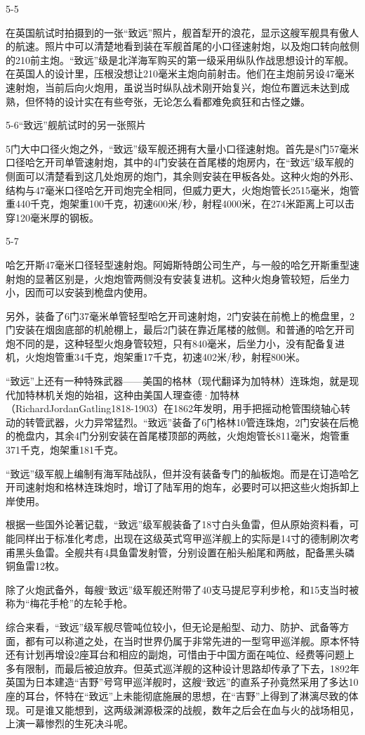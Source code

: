 \documentclass[12pt,UTF8]{ctexbook}
\begin{document}
5-5

在英国航试时拍摄到的一张“致远”照片，舰首犁开的浪花，显示这艘军舰具有傲人的航速。照片中可以清楚地看到装在军舰首尾的小口径速射炮，以及炮口转向舷侧的210前主炮。“致远”级是北洋海军购买的第一级采用纵队作战思想设计的军舰。在英国人的设计里，压根没想让210毫米主炮向前射击。他们在主炮前另设47毫米速射炮，当前后向火炮用，虽说当时纵队战术刚开始复兴，炮位布置远未达到成熟，但怀特的设计实在有些夸张，无论怎么看都难免疯狂和古怪之嫌。

5-6“致远”舰航试时的另一张照片

5门大中口径火炮之外，“致远”级军舰还拥有大量小口径速射炮。首先是8门57毫米口径哈乞开司单管速射炮，其中的4门安装在首尾楼的炮房内，在“致远”级军舰的侧面可以清楚看到这几处炮房的炮门，其余则安装在甲板各处。这种火炮的外形、结构与47毫米口径哈乞开司炮完全相同，但威力更大，火炮炮管长2515毫米，炮管重440千克，炮架重100千克，初速600米/秒，射程4000米，在274米距离上可以击穿120毫米厚的钢板。

5-7

哈乞开斯47毫米口径轻型速射炮。阿姆斯特朗公司生产，与一般的哈乞开斯重型速射炮的显著区别是，火炮炮管两侧没有安装复进机。这种火炮身管较短，后坐力小，因而可以安装到桅盘内使用。

另外，装备了6门37毫米单管轻型哈乞开司速射炮，2门安装在前桅上的桅盘里，2门安装在烟囱底部的机舱棚上，最后2门装在靠近尾楼的舷侧。和普通的哈乞开司炮不同的是，这种轻型火炮身管较短，只有840毫米，后坐力小，没有配备复进机，火炮炮管重34千克，炮架重17千克，初速402米/秒，射程800米。

“致远”上还有一种特殊武器——美国的格林（现代翻译为加特林）连珠炮，就是现代加特林机关炮的始祖，这种由美国人理查德·加特林（RichardJordanGatling1818-1903）在1862年发明，用手把摇动枪管围绕轴心转动的转管武器，火力异常猛烈。“致远”装备了6门格林10管连珠炮，2门安装在后桅的桅盘内，其余4门分别安装在首尾楼顶部的两舷，火炮炮管长811毫米，炮管重371千克，炮架重181千克。

“致远”级军舰上编制有海军陆战队，但并没有装备专门的舢板炮。而是在订造哈乞开司速射炮和格林连珠炮时，增订了陆军用的炮车，必要时可以把这些火炮拆卸上岸使用。

根据一些国外论著记载，“致远”级军舰装备了18寸白头鱼雷，但从原始资料看，可能同样出于标准化考虑，出现在这级英式穹甲巡洋舰上的实际是14寸的德制刷次考甫黑头鱼雷。全舰共有4具鱼雷发射管，分别设置在船头船尾和两舷，配备黑头磷铜鱼雷12枚。

除了火炮武备外，每艘“致远”级军舰还附带了40支马提尼亨利步枪，和15支当时被称为“梅花手枪”的左轮手枪。

综合来看，“致远”级军舰尽管吨位较小，但无论是船型、动力、防护、武备等方面，都有可以称道之处，在当时世界仍属于非常先进的一型穹甲巡洋舰。原本怀特还有计划再增设2座耳台和相应的副炮，可惜由于中国方面在吨位、经费等问题上多有限制，而最后被迫放弃。但英式巡洋舰的这种设计思路却传承了下去，1892年英国为日本建造“吉野”号穹甲巡洋舰时，这艘“致远”的直系子孙竟然采用了多达10座的耳台，怀特在“致远”上未能彻底施展的思想，在“吉野”上得到了淋漓尽致的体现。可是谁又能想到，这两级渊源极深的战舰，数年之后会在血与火的战场相见，上演一幕惨烈的生死决斗呢。
\end{document}
